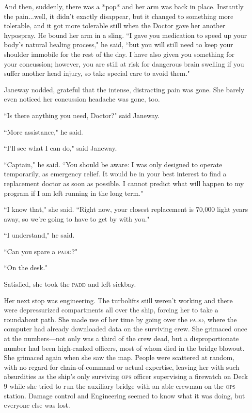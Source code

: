 \documentclass[twoside,letterpaper,12pt]{memoir}
\begin{document}
And then, suddenly, there was a *pop* and her arm was back in place. Instantly the pain...well, it didn't exactly disappear, but it changed to something more tolerable, and it got more tolerable still when the Doctor gave her another hypospray. He bound her arm in a sling. ``I gave you medication to speed up your body's natural healing process," he said, ``but you will still need to keep your shoulder immobile for the rest of the day. I have also given you something for your concussion; however, you are still at risk for dangerous brain swelling if you suffer another head injury, so take special care to avoid them."

Janeway nodded, grateful that the intense, distracting pain was gone. She barely even noticed her concussion headache was gone, too.

``Is there anything you need, Doctor?" said Janeway.

``More assistance," he said.

``I'll see what I can do," said Janeway.

``Captain," he said. ``You should be aware: I was only designed to operate temporarily, as emergency relief. It would be in your best interest to find a replacement doctor as soon as possible. I cannot predict what will happen to my program if I am left running in the long term."

``I know that," she said. ``Right now, your closest replacement is 70,000 light years away, so we're going to have to get by with you."

``I understand," he said.

``Can you spare a \textsc{padd}?"

``On the desk."

Satisfied, she took the \textsc{padd} and left sickbay.

Her next stop was engineering. The turbolifts still weren't working and there were depressurized compartments all over the ship, forcing her to take a roundabout path. She made use of her time by going over the \textsc{padd}, where the computer had already downloaded data on the surviving crew. She grimaced once at the numbers---not only was a third of the crew dead, but a disproportionate number had been high-ranked officers, most of whom died in the bridge blowout. She grimaced again when she saw the map. People were scattered at random, with no regard for chain-of-command or actual expertise, leaving her with such absurdities as the ship's only surviving \textsc{ops} officer supervising a firewatch on Deck 9 while she tried to run the auxiliary bridge with an able crewman on the \textsc{ops} station. Damage control and Engineering seemed to know what it was doing, but everyone else was lost.
\end{document}
